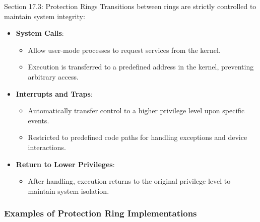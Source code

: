 \begin{notes}{Section 17.3: Protection Rings}
    Transitions between rings are strictly controlled to maintain system integrity:
    \begin{itemize}
        \item \textbf{System Calls}:
        \begin{itemize}
            \item Allow user-mode processes to request services from the kernel.
            \item Execution is transferred to a predefined address in the kernel, preventing arbitrary access.
        \end{itemize}
        \item \textbf{Interrupts and Traps}:
        \begin{itemize}
            \item Automatically transfer control to a higher privilege level upon specific events.
            \item Restricted to predefined code paths for handling exceptions and device interactions.
        \end{itemize}
        \item \textbf{Return to Lower Privileges}:
        \begin{itemize}
            \item After handling, execution returns to the original privilege level to maintain system isolation.
        \end{itemize}
    \end{itemize}
    
    \subsubsection*{Examples of Protection Ring Implementations}
    

\end{notes}
